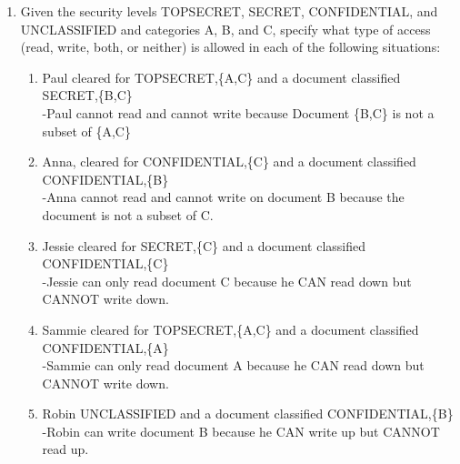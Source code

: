 \documentclass[12pt]{article}
\begin{document}
\renewcommand{\headrulewidth}{0.4pt}

\vspace{-3mm}

\begin{enumerate}

	\item {Given the security levels TOPSECRET, SECRET, CONFIDENTIAL, and UNCLASSIFIED and categories A, B, and C, specify what type of access (read, write, both, or neither) is allowed in each of the following situations:} \\
\begin{enumerate}
	\item{ Paul cleared for TOPSECRET,\{A,C\} and a document classified SECRET,\{B,C\} }\\
	-Paul cannot read and cannot write because Document \{B,C\} is not a subset of \{A,C\}
	\item{ Anna, cleared for CONFIDENTIAL,\{C\} and a document classified CONFIDENTIAL,\{B\} }\\
	-Anna cannot read and cannot write on document B because the document is not a subset of C. 
	\item{Jessie cleared for SECRET,\{C\} and a document classified CONFIDENTIAL,\{C\} }\\
	-Jessie can only read document C because he CAN read down but  CANNOT write down.
	\item{ Sammie cleared for TOPSECRET,\{A,C\} and a document classified CONFIDENTIAL,\{A\} }\\
	-Sammie can only read document A because he CAN read down but CANNOT write down.
	\item{Robin UNCLASSIFIED and a document classified CONFIDENTIAL,\{B\} }\\
	-Robin can write document B because he CAN write up but CANNOT read up. 
\end{enumerate}
	
	\vspace{10pt}
	

\end{enumerate}
\end{document}
